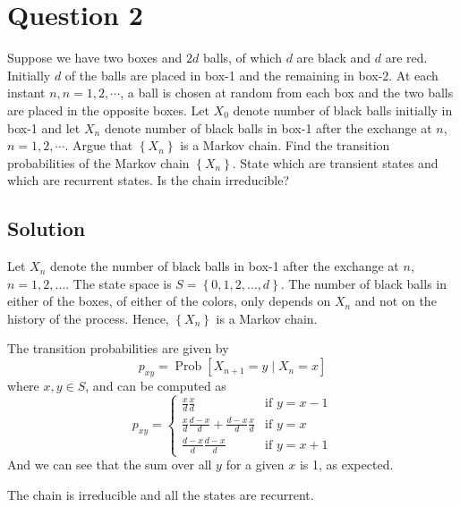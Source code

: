 \section*{Question 2}

Suppose we have two boxes and \( 2 d \) balls, of which \( d \) are black and \( d \) are red.
Initially \( d \) of the balls are placed in box-1 and the remaining in box-2.
At each instant \( n, n=1,2, \cdots \), a ball is chosen at random from each box and the two balls are placed in the opposite boxes.
Let \( X_{0} \) denote number of black balls initially in box-1 and let \( X_{n} \) denote number of black balls in box-1 after the exchange at \( n \), \( n=1,2, \cdots \).
Argue that \( \left \{ X_{n}\right \} \) is a Markov chain.
Find the transition probabilities of the Markov chain \( \left \{ X_{n}\right \} \).
State which are transient states and which are recurrent states.
Is the chain irreducible?

\subsection*{Solution}

Let \( X_{n} \) denote the number of black balls in box-1 after the exchange at \( n \), \( n=1,2, \dots \).
The state space is \( S=\left \{0,1,2, \dots , d\right \} \).
The number of black balls in either of the boxes, of either of the colors, only depends on \( X_{n} \) and not on the history of the process.
Hence, \( \left \{ X_{n}\right \} \) is a Markov chain.

The transition probabilities are given by
\[
    p_{xy}=\operatorname{Prob}\left[X_{n+1}=y \mid X_{n}=x\right]
\]
where \( x,y \in S \), and can be computed as
\[
    p_{xy}=
    \begin{cases}
        \frac{x}{d} \frac{x}{d}
         & \text{if } y = x-1
        \\
        \frac{x}{d} \frac{d-x}{d} + \frac{d-x}{d} \frac{x}{d}
         & \text{if } y = x
        \\
        \frac{d-x}{d} \frac{d-x}{d}
         & \text{if } y = x + 1
    \end{cases}
\]
And we can see that the sum over all \( y \) for a given \( x \) is 1, as expected.

The chain is irreducible and all the states are recurrent.
